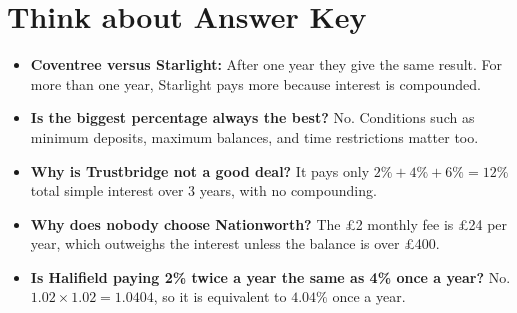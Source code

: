 \documentclass[12pt]{article}
\begin{document}
\section*{Think about Answer Key}

\begin{itemize}[leftmargin=5mm, itemsep=2mm, topsep=2mm]

\item \textbf{Coventree versus Starlight:} After one year they give the same result. For more than one year, Starlight pays more because interest is compounded.

\item \textbf{Is the biggest percentage always the best?} No. Conditions such as minimum deposits, maximum balances, and time restrictions matter too.

\item \textbf{Why is Trustbridge not a good deal?} It pays only \(2\%+4\%+6\%=12\%\) total simple interest over 3 years, with no compounding.

\item \textbf{Why does nobody choose Nationworth?} The \pounds2 monthly fee is \pounds24 per year, which outweighs the interest unless the balance is over \pounds400.

\item \textbf{Is Halifield paying 2\% twice a year the same as 4\% once a year?} No. \(1.02 \times 1.02 = 1.0404\), so it is equivalent to \(4.04\%\) once a year.

\end{itemize}
\end{document}
